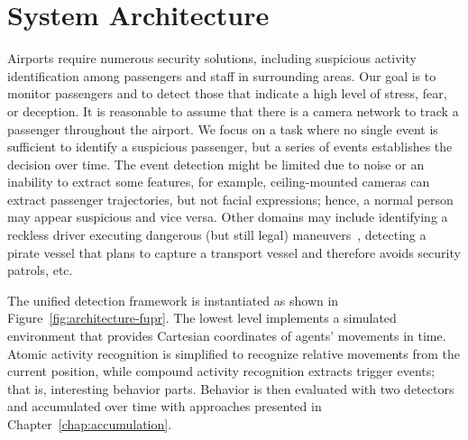 

\section{System Architecture}

Airports require numerous security solutions, including suspicious activity identification among passengers and staff in surrounding areas.
%
Our goal is to monitor passengers and to detect those that indicate a high level of stress, fear, or deception. It is reasonable to assume that there is a camera network to track a passenger throughout the airport. We focus on a task where no single event is sufficient to identify a suspicious passenger, but a series of events establishes the decision over time. The event detection might be limited due to noise or an inability to extract some features, for example, ceiling-mounted cameras can extract passenger trajectories, but not facial expressions; hence, a normal person may appear suspicious and vice versa. 
%
%
Other domains may include identifying a reckless driver executing dangerous (but still legal) maneuvers~\citep{Avrahami-Zilberbrand2009}, detecting a pirate vessel that plans to capture a transport vessel and therefore avoids security patrols, etc. 

The unified detection framework is instantiated as shown in Figure~\ref{fig:architecture-fupr}. The lowest level implements a simulated environment that provides Cartesian coordinates of agents' movements in time. Atomic activity recognition is simplified to recognize relative movements from the current position, while compound activity recognition extracts trigger events; that is, interesting behavior parts. Behavior is then evaluated with two detectors and accumulated over time with approaches presented in Chapter~\ref{chap:accumulation}.

